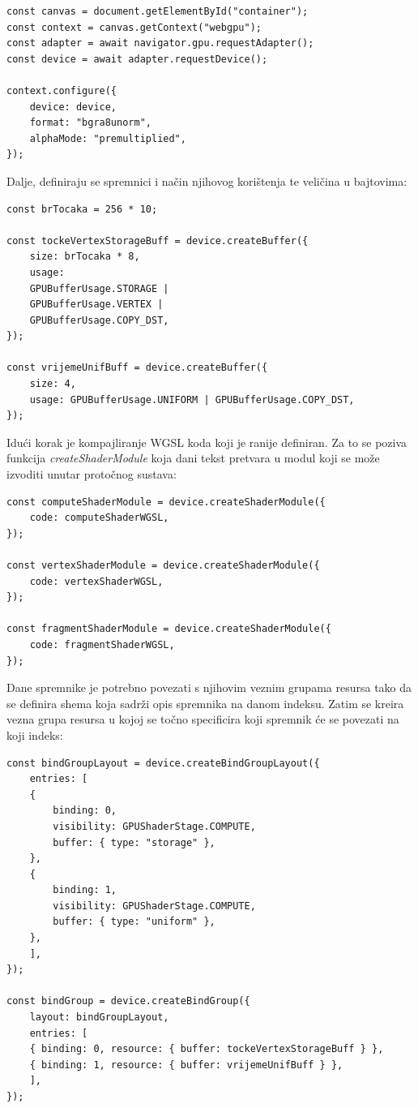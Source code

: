 \documentclass{foi}
\begin{document}
\begin{verbatim}
const canvas = document.getElementById("container");
const context = canvas.getContext("webgpu");
const adapter = await navigator.gpu.requestAdapter();
const device = await adapter.requestDevice();

context.configure({
	device: device,
	format: "bgra8unorm",
	alphaMode: "premultiplied",
});
\end{verbatim}
  
Dalje, definiraju se spremnici i način njihovog korištenja te veličina u bajtovima:
\begin{verbatim}
const brTocaka = 256 * 10;

const tockeVertexStorageBuff = device.createBuffer({
	size: brTocaka * 8,
	usage:
	GPUBufferUsage.STORAGE |
	GPUBufferUsage.VERTEX |
	GPUBufferUsage.COPY_DST,
});

const vrijemeUnifBuff = device.createBuffer({
	size: 4,
	usage: GPUBufferUsage.UNIFORM | GPUBufferUsage.COPY_DST,
});

\end{verbatim}

Idući korak je kompajliranje WGSL koda koji je ranije definiran. Za to se poziva funkcija \textit{createShaderModule} koja dani tekst pretvara u modul koji se može izvoditi unutar protočnog sustava:

\begin{verbatim}
const computeShaderModule = device.createShaderModule({
	code: computeShaderWGSL,
});

const vertexShaderModule = device.createShaderModule({
	code: vertexShaderWGSL,
});

const fragmentShaderModule = device.createShaderModule({
	code: fragmentShaderWGSL,
});
\end{verbatim}

Dane spremnike je potrebno povezati s njihovim veznim grupama resursa tako da se definira shema koja sadrži opis spremnika na danom indeksu. Zatim se kreira vezna grupa resursa u kojoj se točno specificira koji spremnik će se povezati na koji indeks:

\begin{verbatim}
const bindGroupLayout = device.createBindGroupLayout({
	entries: [
	{
		binding: 0,
		visibility: GPUShaderStage.COMPUTE,
		buffer: { type: "storage" },
	},
	{
		binding: 1,
		visibility: GPUShaderStage.COMPUTE,
		buffer: { type: "uniform" },
	},
	],
});

const bindGroup = device.createBindGroup({
	layout: bindGroupLayout,
	entries: [
	{ binding: 0, resource: { buffer: tockeVertexStorageBuff } },
	{ binding: 1, resource: { buffer: vrijemeUnifBuff } },
	],
});
\end{verbatim}
\end{document}
